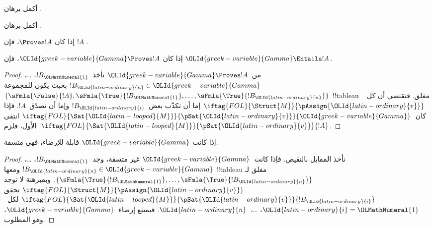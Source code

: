 \documentclass[../../../include/open-logic-section]{subfiles}
\begin{document}
\begin{prob}
أكمل برهان .
\end{prob}
\tagendprob

\begin{prob}
أكمل برهان .
\end{prob}
\tagendprob

\begin{cor}
إذا كان $\Proves !A$، فإن $!A$ .
\end{cor}

\begin{cor}
إذا كان $\OLId{greek-variable}{Gamma} \Proves !A$، فإن $\OLId{greek-variable}{Gamma} \Entails !A$.
\end{cor}

\begin{proof}
  من~$\OLId{greek-variable}{Gamma} \Proves !A$ نأخذ~$!B_\OLMathNumeral{1}$، \dots، $!B_\OLId{latin-ordinary}{n} \in
  \OLId{greek-variable}{Gamma}$ بحيث يكون للمجموعة~$\{\sFmla{\False}{!A}, \sFmla{\True}{!B_\OLMathNumeral{1}}, \dots,
  \sFmla{\True}{!B_\OLId{latin-ordinary}{n}}\}$ !!{tableau} مغلق. فتقتضي
   أن كل
  ~$\iftag{FOL}{\Struct{M}}{\pAssign{\OLId{latin-ordinary}{v}}}$
  إما أن تكذّب بعض~$!B_\OLId{latin-ordinary}{i}$ وإما أن تصدّق~$!A$.
  فإذا كان~$\iftag{FOL}{\Sat{\OLId{latin-looped}{M}}}{\pSat{\OLId{latin-ordinary}{v}}}{\OLId{greek-variable}{Gamma}}$ انتفى الأول،
  فلزم~$\iftag{FOL}{\Sat{\OLId{latin-looped}{M}}}{\pSat{\OLId{latin-ordinary}{v}}}{!A}$.
\end{proof}

\begin{cor}
إذا كانت $\OLId{greek-variable}{Gamma}$ قابلة للإرضاء، فهي متسقة.
\end{cor}

\begin{proof}
نأخذ المقابل بالنقيض. فإذا كانت~$\OLId{greek-variable}{Gamma}$ غير متسقة، وجد~$!B_\OLMathNumeral{1}$،
\dots، $!B_\OLId{latin-ordinary}{n} \in \OLId{greek-variable}{Gamma}$ ومعها !!{tableau} مغلق لـ
$\{\sFmla{\True}{!B_\OLMathNumeral{1}}, \dots, \sFmla{\True}{!B_\OLId{latin-ordinary}{n}}\}$.
وبمبرهنة  لا توجد
$\iftag{FOL}{\Struct{M}}{\pAssign{\OLId{latin-ordinary}{v}}}$ تحقق
$\iftag{FOL}{\Sat{\OLId{latin-looped}{M}}}{\pSat{\OLId{latin-ordinary}{v}}}{!B_\OLId{latin-ordinary}{i}}$ لكل~$\OLId{latin-ordinary}{i}=\OLMathNumeral{1}$، \dots،~$\OLId{latin-ordinary}{n}$.
فيمتنع إرضاء~$\OLId{greek-variable}{Gamma}$، وهو المطلوب.
\end{proof}
\end{document}
